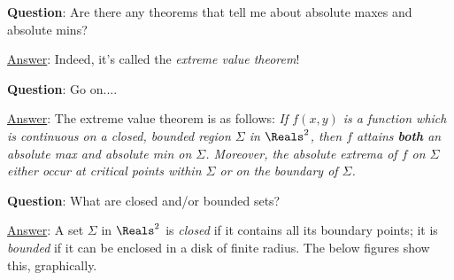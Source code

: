 \documentclass[12pt]{article}
\renewcommand{\Q}{\vspace{6mm}\noindent\textbf{Question}: }
\newcommand{\Ans}{\ul{Answer}: }
\begin{document}
	\Q Are there any theorems that tell me about absolute maxes and absolute mins?
	
	\Ans Indeed, it's called the \textit{extreme value theorem}!
	
	\Q Go on....
	
	\Ans The extreme value theorem is as follows: \textit{If $f(x,y)$ is a function which is continuous on a closed, bounded region $\Sigma$ in $\Reals^2$, then $f$ attains \textbf{both} an absolute max and absolute min on $\Sigma$. Moreover, the absolute extrema of $f$ on $\Sigma$ either occur at critical points within $\Sigma$ or on the boundary of $\Sigma$.}
	
	\Q What are closed and/or bounded sets?
	
	\Ans A set $\Sigma$ in $\Reals^2$ is \textit{closed} if it contains all its boundary points; it is \textit{bounded} if it can be enclosed in a disk of finite radius. The below figures show this, graphically.
	\vspace{3mm}
	
\end{document}
